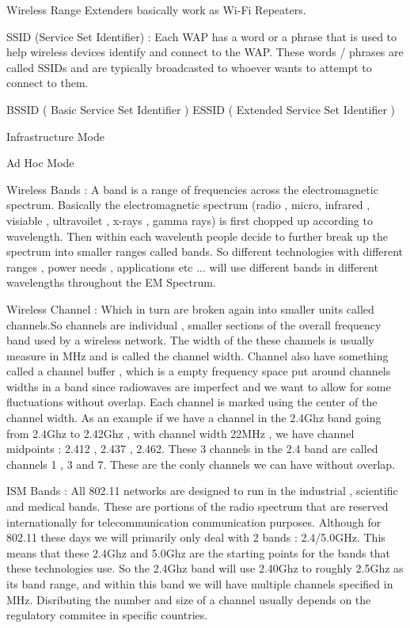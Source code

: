 Wireless Range Extenders basically work as Wi-Fi Repeaters.

SSID (Service Set Identifier) : Each WAP has a word or a phrase that is used to
help wireless devices identify and connect to the WAP. These words / phrases are
called SSIDs and are typically broadcasted to whoever wants to attempt to
connect to them.

BSSID ( Basic Service Set Identifier )
ESSID ( Extended Service Set Identifier )

Infrastructure Mode

Ad Hoc Mode

Wireless Bands : A band is a range of frequencies across the electromagnetic
spectrum. Basically the electromagnetic spectrum (radio , micro, infrared ,
visiable , ultravoilet , x-rays , gamma rays) is first chopped up according to
wavelength. Then within each wavelenth people decide to further break up the
spectrum into smaller ranges called bands.  So different technologies with
different ranges , power needs , applications etc ... will use different bands
in different wavelengths throughout the EM Spectrum.

Wireless Channel : Which in turn are broken again into smaller units called
channels.So channels are individual , smaller sections of the overall frequency
band used by a wireless network. The width of the these channels is usually
measure in MHz and is called the channel width. Channel also have something
called a channel buffer , which is a empty frequency space put around channels
widths in a band since radiowaves are imperfect and we want to allow for some
fluctuations without overlap. Each channel is marked using the center of the
channel width.  As an example if we have a channel in the 2.4Ghz band going from
2.4Ghz to 2.42Ghz , with channel width 22MHz , we have channel midpoints : 2.412
, 2.437 , 2.462. These 3 channels in the 2.4 band are called channels 1 , 3 and
7.  These are the conly channels we can have without overlap.

ISM Bands : All 802.11 networks are designed to run in the industrial ,
scientific and medical bands. These are portions of the radio spectrum that are
reserved internationally for telecommunication communication purposes.  Although
for 802.11 these days we will primarily only deal with 2 bands : 2.4/5.0GHz.
This means that these 2.4Ghz and 5.0Ghz are the starting points for the bands
that these technologies use. So the 2.4Ghz band will use 2.40Ghz to roughly
2.5Ghz as its band range, and within this band we will have multiple channels
specified in MHz. Disributing the number and size of a channel usually depends
on the regulatory commitee in specific countries.

